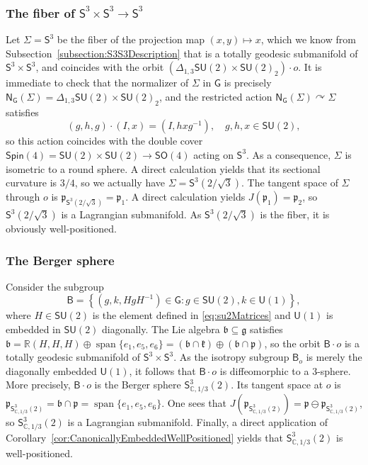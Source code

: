 \documentclass[11pt,a4paper,final]{amsart}
\newcommand{\g}{\mathfrak}
\newcommand{\R}{\mathbb{R}}
\newcommand{\C}{\mathbb{C}}
\newcommand{\vecspan}{\operatorname{span}}
\theoremstyle{definition}
\begin{document}
\subsubsection{The fiber of $\mathsf{S}^{3}\times\mathsf{S}^{3}\to\mathsf{S}^{3}$ \cite[Example~3.1]{ZhangDioosHuVranckenWang}}\label{subsec:S3S3RoundS3}
Let $\Sigma=\mathsf{S}^{3}$ be the fiber of the projection map $(x,y)\mapsto x$, which we know from Subsection~\ref{subsection:S3S3Description} that is a totally geodesic submanifold of $\mathsf{S}^{3}\times\mathsf{S}^{3}$, and coincides with the orbit $\left(\Delta_{1,3}\mathsf{SU}(2)\times\mathsf{SU}(2)_{2}\right)\cdot o$.
It is immediate to check that the normalizer of $\Sigma$ in $\mathsf{G}$ is precisely $\mathsf{N}_{\mathsf{G}}(\Sigma)=\Delta_{1,3}\mathsf{SU}(2)\times\mathsf{SU}(2)_{2}$, and the restricted action $\mathsf{N}_{\mathsf{G}}(\Sigma)\curvearrowright \Sigma$ satisfies
\begin{equation}\label{eq:DoubleCover}
	(g,h,g)\cdot (I,x)=(I,hxg^{-1}), \quad g,h,x\in\mathsf{SU}(2),
\end{equation}
so this action coincides with the double cover $\mathsf{Spin}(4)=\mathsf{SU}(2)\times\mathsf{SU}(2)\to\mathsf{SO}(4)$ acting on $\mathsf{S}^{3}$.
As a consequence, $\Sigma$ is isometric to a round sphere.
A direct calculation yields that its sectional curvature is $3/4$, so we actually have $\Sigma=\mathsf{S}^{3}\left(2/\sqrt{3}\right)$.
The tangent space of $\Sigma$ through $o$ is
$
	\g{p}_{\mathsf{S}^{3}\left( 2/\sqrt{3} \right) }=\g{p}_{1}
$.
A direct calculation yields $J (\g{p}_{1})=\g{p}_{2}$, so $\mathsf{S}^{3}\left( 2/\sqrt{3} \right)$ is a Lagrangian submanifold.
As $\mathsf{S}^{3}\left(2/\sqrt{3}\right)$ is the fiber, it is obviously well-positioned.
	
\subsubsection{The Berger sphere \cite[Example~3.4]{ZhangDioosHuVranckenWang}}\label{subsec:S3S3BergerS3}
Consider the subgroup \[\mathsf{B}=\left\{ \left(g,k,HgH^{-1}\right)\in\mathsf{G}\colon g\in\mathsf{SU}(2),k\in\mathsf{U}(1) \right\},\] where $H\in\mathsf{SU}(2)$ is the element defined in \eqref{eq:su2Matrices} and $\mathsf{U}(1)$ is embedded in $\mathsf{SU}(2)$ diagonally.
The Lie algebra $\g{b}\subseteq \g{g}$ satisfies $\g{b}=\R(H,H,H)\oplus\vecspan\{ e_{1},e_{5},e_{6} \}=(\g{b}\cap\g{k})\oplus(\g{b}\cap\g{p})$,
so the orbit $\mathsf{B}\cdot o$ is a totally geodesic submanifold of $\mathsf{S}^{3}\times\mathsf{S}^{3}$.
As the isotropy subgroup $\mathsf{B}_{o}$ is merely the diagonally embedded $\mathsf{U}(1)$, it follows that $\mathsf{B}\cdot o$ is diffeomorphic to a $3$-sphere.
More precisely, $\mathsf{B}\cdot o$ is the Berger sphere $\mathsf{S}^{3}_{\C,1/3}(2)$. 
Its tangent space at $o$ is $\g{p}_{\mathsf{S}^{3}_{\C,1/3}(2)}=\g{b}\cap\g{p}=\vecspan\{e_{1},e_{5},e_{6}\}$.
One sees that $J(\g{p}_{\mathsf{S}^{3}_{\C,1/3}(2)})=\g{p}\ominus \g{p}_{\mathsf{S}^{3}_{\C,1/3}(2)}$, so $\mathsf{S}^{3}_{\C,1/3}(2)$ is a Lagrangian submanifold.
Finally, a direct application of Corollary~\ref{cor:CanonicallyEmbeddedWellPositioned} yields that $\mathsf{S}^{3}_{\C,1/3}(2)$ is well-positioned.
\end{document}
